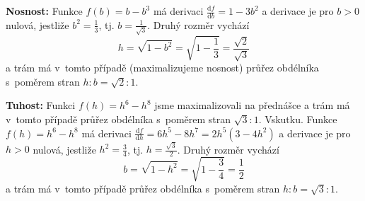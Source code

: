 \textbf{Nosnost: }Funkce $f(b)=b-b^3$ má derivaci $\frac{\mathrm df}{\mathrm db}=1-3b^2$ a derivace je pro $b>0$ nulová, jestliže $b^2=\frac 13$, tj. $b=\frac{1}{\sqrt 3}$.  Druhý rozměr vychází
$$h=\sqrt{1-b^2}=\sqrt{1-\frac 13}=\frac{\sqrt 2}{\sqrt 3}$$ a trám má v tomto případě (maximalizujeme nosnost) průřez obdélníka s poměrem stran $h:b=\sqrt 2:1$.

\textbf{Tuhost: }Funkci $f(h)=h^6-h^8$ jsme maximalizovali na přednášce a  trám má v tomto případě průřez obdélníka s poměrem stran $\sqrt 3:1$.
Vskutku. Funkce $f(h)=h^6-h^8$ má derivaci $\frac{\mathrm df}{\mathrm dh}=6h^5-8h^7=2h^5(3-4h^2)$ a derivace je pro $h>0$ nulová, jestliže $h^2=\frac 34$, tj. $h=\frac{\sqrt 3}{2}$.  Druhý rozměr vychází
$$b=\sqrt{1-h^2}=\sqrt{1-\frac 34}=\frac{1}{2}$$ a trám má v tomto případě  průřez obdélníka s poměrem stran $h:b=\sqrt 3:1$.


\konec

\stranka


